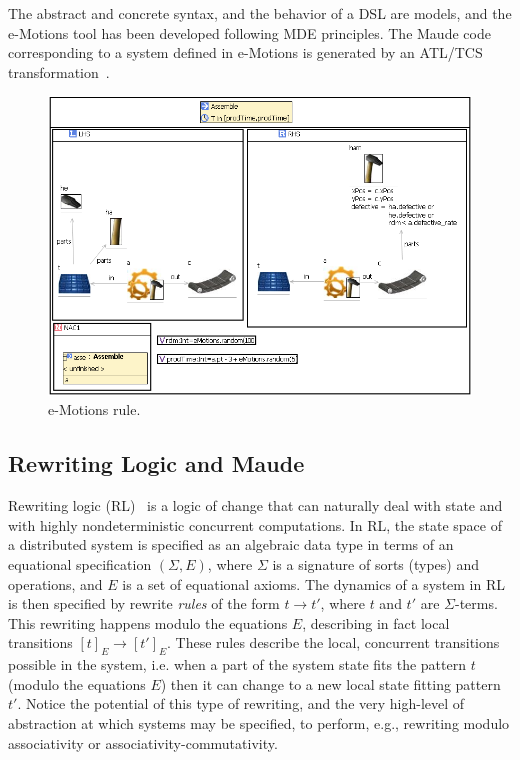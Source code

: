 The abstract and concrete syntax, and the behavior of a DSL are models, and the e-Motions tool has been developed following MDE principles. The Maude code corresponding to a system defined in e-Motions is generated by an ATL/TCS transformation~\cite{atl}.

\begin{figure}[htp]
  \centering
  \includegraphics[width=\textwidth]{imgs/assemble}
  \caption{e-Motions  rule.}\label{fig:assemble}
\end{figure}

\subsection{Rewriting Logic and Maude}

Rewriting logic (RL)~\cite{Meseguer:92-tcs} is a logic of change
that can naturally deal with state and with highly nondeterministic
concurrent computations.
In RL,  the state space of a distributed system is specified as an
algebraic data type in terms of an equational specification
$(\Sigma,E)$, where $\Sigma$ is a signature of sorts (types) and
operations, and $E$ is a set of equational axioms. The dynamics of a
system in RL is then specified by rewrite \emph{rules} of the form
$t \rightarrow t'$, where $t$ and $t'$ are $\Sigma$-terms.
This rewriting happens modulo the equations $E$, describing in fact
local transitions $[t]_E\rightarrow[t']_E$.
These rules describe the local, concurrent transitions possible in the
system, i.e. when a part of the system state fits the pattern $t$
(modulo the equations $E$)
then it can change to a new local state fitting pattern $t'$.
Notice the potential of this type of rewriting, and the very high-level of
abstraction at which systems may be specified, to perform, e.g.,
rewriting modulo associativity or associativity-commutativity.

